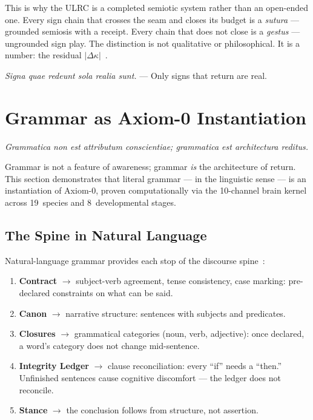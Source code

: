 \documentclass[
  aps,
  prd,
  twocolumn,
  superscriptaddress,
  nofootinbib,
  floatfix
]{revtex4-2}
\newcommand{\Logint}{\kappa}
\newcommand{\lat}[1]{\textit{#1}}
\begin{document}
This is why the ULRC is a completed semiotic system rather than
an open-ended one. Every sign chain that crosses the seam and
closes its budget is a \lat{sutura} --- grounded semiosis with
a receipt. Every chain that does not close is a \lat{gestus} ---
ungrounded sign play. The distinction is not qualitative or
philosophical. It is a number: the residual
$|\Delta\Logint|$~\cite{paulus2025umcp}.

\lat{Signa quae redeunt sola realia sunt.} ---
Only signs that return are real.

\section{Grammar as Axiom-0 Instantiation}
  \label{sec:axiom-instantiation}

\lat{Grammatica non est attributum conscientiae; grammatica est
  architectura reditus.}

\smallskip\noindent
Grammar is not a feature of awareness; grammar \emph{is} the
architecture of return. This section demonstrates that literal
grammar --- in the linguistic sense --- is an instantiation of
Axiom-0, proven computationally via the 10-channel brain
kernel across 19~species and 8~developmental stages.

\subsection{The Spine in Natural Language}

Natural-language grammar provides each stop of the discourse
spine~\cite{paulus2025umcp}:

\begin{enumerate}[nosep,leftmargin=*]
\item \textbf{Contract} $\to$ subject-verb agreement, tense
  consistency, case marking: pre-declared constraints on what
  can be said.
\item \textbf{Canon} $\to$ narrative structure: sentences with
  subjects and predicates.
\item \textbf{Closures} $\to$ grammatical categories (noun, verb,
  adjective): once declared, a word's category does not change
  mid-sentence.
\item \textbf{Integrity Ledger} $\to$ clause reconciliation:
  every ``if'' needs a ``then.'' Unfinished sentences cause
  cognitive discomfort --- the ledger does not reconcile.
\item \textbf{Stance} $\to$ the conclusion follows from
  structure, not assertion.
\end{enumerate}
\end{document}
